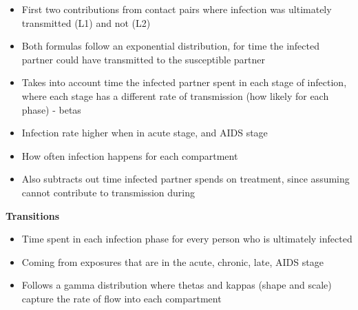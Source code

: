 \begin{itemize}
    \item First two contributions from contact pairs where infection was ultimately transmitted (L1) and not (L2)
    \item Both formulas follow an exponential distribution, for time the infected partner could have transmitted to the susceptible partner
    \item Takes into account time the infected partner spent in each stage of infection, where each stage has a different rate of transmission (how likely for each phase) - betas
    \item Infection rate higher when in acute stage, and AIDS stage
    \item How often infection happens for each compartment
    \item Also subtracts out time infected partner spends on treatment, since assuming cannot contribute to transmission during
\end{itemize}

\textbf{Transitions}

\begin{itemize}
    \item Time spent in each infection phase for every person who is ultimately infected
    \item Coming from exposures that are in the acute, chronic, late, AIDS stage
    \item Follows a gamma distribution where thetas and kappas (shape and scale) capture the rate of flow into each compartment
\end{itemize}